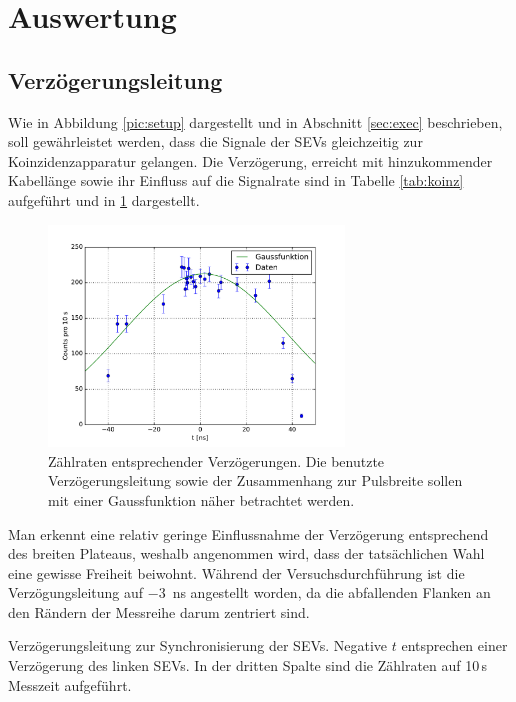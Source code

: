 \label{sec:exec}

\section{Auswertung}
\subsection{Verzögerungsleitung}
Wie in Abbildung \ref{pic:setup} dargestellt und in Abschnitt \ref{sec:exec} beschrieben, soll gewährleistet werden, dass die Signale der SEVs 
gleichzeitig zur Koinzidenzapparatur gelangen. Die Verzögerung, erreicht mit hinzukommender Kabellänge sowie ihr Einfluss auf die Signalrate
sind in Tabelle \ref{tab:koinz} aufgeführt und in \ref{pic:koinz} dargestellt. 
\begin{figure}[t]
 \includegraphics[width=0.7\textwidth]{../pics/koinzidenz.pdf}
 \caption{Zählraten entsprechender Verzögerungen. Die benutzte Verzögerungsleitung sowie der Zusammenhang zur Pulsbreite sollen mit einer 
 Gaussfunktion näher betrachtet werden.}
 \label{pic:koinz}
\end{figure}
Man erkennt eine relativ geringe Einflussnahme der Verzögerung entsprechend des breiten Plateaus,
weshalb angenommen wird, dass der tatsächlichen Wahl eine gewisse Freiheit beiwohnt. 
Während der Versuchsdurchführung ist die Verzögungsleitung auf \SI{-3}{\nano\second} angestellt worden, da die abfallenden Flanken an den 
Rändern der Messreihe darum zentriert sind. 
\begin{table}[b]

\caption{Verzögerungsleitung zur Synchronisierung der SEVs. Negative $t$ entsprechen einer Verzögerung des linken SEVs. In der dritten Spalte 
sind die Zählraten auf 10\,s Messzeit aufgeführt.}
\label{tab:koinz}
\end{table}
